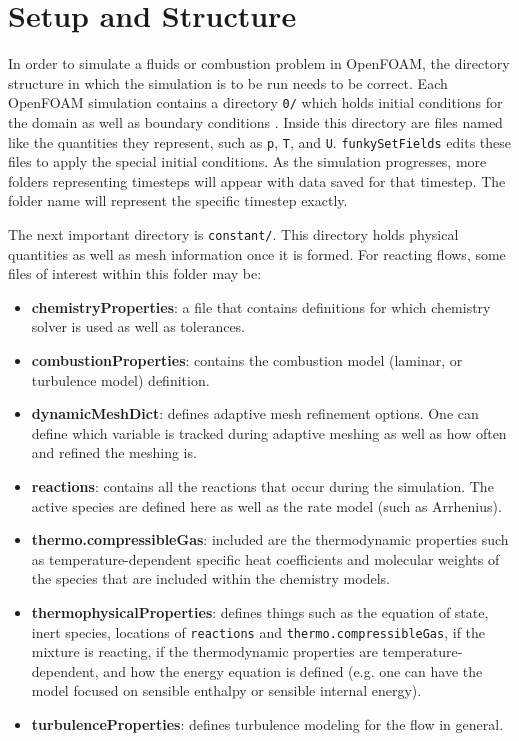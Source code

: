 \section{Setup and Structure}
In order to simulate a fluids or combustion problem in OpenFOAM, the directory structure in which the simulation is to be run needs to be correct. Each OpenFOAM simulation contains a directory \verb|0/| which holds initial conditions for the domain as well as boundary conditions \cite{ofug}. Inside this directory are files named like the quantities they represent, such as \verb|p|, \verb|T|, and \verb|U|. \verb|funkySetFields| edits these files to apply the special initial conditions. As the simulation progresses, more folders representing timesteps will appear with data saved for that timestep. The folder name will represent the specific timestep exactly. 

The next important directory is \verb|constant/|. This directory holds physical quantities as well as mesh information once it is formed. For reacting flows, some files of interest within this folder may be:

\begin{itemize}
    \item \textbf{chemistryProperties}: a file that contains definitions for which chemistry solver is used as well as tolerances.
    \item \textbf{combustionProperties}: contains the combustion model (laminar, or turbulence model) definition.
    \item \textbf{dynamicMeshDict}: defines adaptive mesh refinement options. One can define which variable is tracked during adaptive meshing as well as how often and refined the meshing is. 
    \item \textbf{reactions}: contains all the reactions that occur during the simulation. The active species are defined here as well as the rate model (such as Arrhenius). 
    \item \textbf{thermo.compressibleGas}: included are the thermodynamic properties such as temperature-dependent specific heat coefficients and molecular weights of the species that are included within the chemistry models.
    \item \textbf{thermophysicalProperties}: defines things such as the equation of state, inert species, locations of \verb|reactions| and \verb|thermo.compressibleGas|, if the mixture is reacting, if the thermodynamic properties are temperature-dependent, and how the energy equation is defined (e.g. one can have the model focused on sensible enthalpy or sensible internal energy).
    \item \textbf{turbulenceProperties}: defines turbulence modeling for the flow in general. 
\end{itemize}

